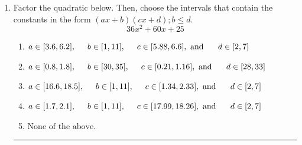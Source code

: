 \documentclass[14pt]{extbook}
\newcommand{\litem}[1]{\item#1\hspace*{-1cm}\rule{\textwidth}{0.4pt}}
\begin{document}
\begin{enumerate}
{\begin{enumerate}[label=\Alph*.]
\end{enumerate} }
\litem{
Factor the quadratic below. Then, choose the intervals that contain the constants in the form $(ax+b)(cx+d); b \leq d.$\[ 36x^{2} +60 x + 25 \]\begin{enumerate}[label=\Alph*.]
\item \( a \in [3.6, 6.2], \hspace*{5mm} b \in [1, 11], \hspace*{5mm} c \in [5.88, 6.6], \text{ and } \hspace*{5mm} d \in [2, 7] \)
\item \( a \in [0.8, 1.8], \hspace*{5mm} b \in [30, 35], \hspace*{5mm} c \in [0.21, 1.16], \text{ and } \hspace*{5mm} d \in [28, 33] \)
\item \( a \in [16.6, 18.5], \hspace*{5mm} b \in [1, 11], \hspace*{5mm} c \in [1.34, 2.33], \text{ and } \hspace*{5mm} d \in [2, 7] \)
\item \( a \in [1.7, 2.1], \hspace*{5mm} b \in [1, 11], \hspace*{5mm} c \in [17.99, 18.26], \text{ and } \hspace*{5mm} d \in [2, 7] \)
\item \( \text{None of the above.} \)


\end{enumerate}}
\end{enumerate}
\end{document}
